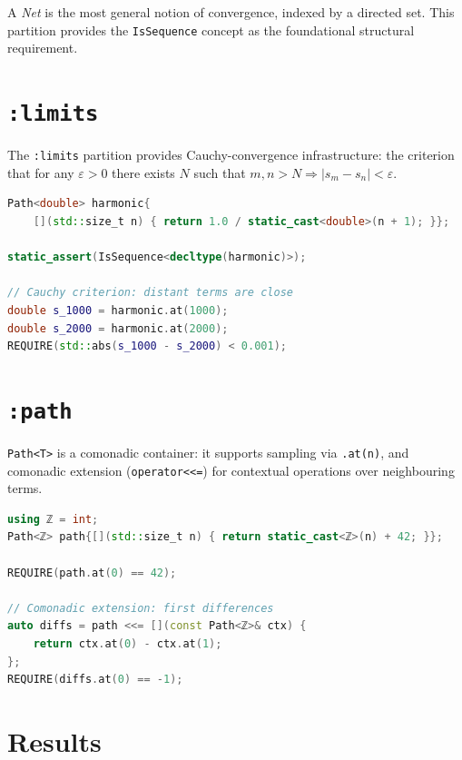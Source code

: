 \documentclass[11pt, a4paper]{report}
\begin{document}
A \emph{Net} is the most general notion of convergence, indexed by a directed set.
This partition provides the \texttt{IsSequence} concept as the foundational structural requirement.

\section{\texttt{:limits}}
\label{sec:sequences-limits}

The \texttt{:limits} partition provides Cauchy-convergence infrastructure: the criterion that for any $\varepsilon > 0$ there exists $N$ such that $m, n > N \Rightarrow |s_m - s_n| < \varepsilon$.

\begin{lstlisting}[language=C++, caption={Sequences: Cauchy convergence of the harmonic series (from \texttt{cauchy\_test.cpp}).}, label={lst:sequences-cauchy}]
Path<double> harmonic{
    [](std::size_t n) { return 1.0 / static_cast<double>(n + 1); }};

static_assert(IsSequence<decltype(harmonic)>);

// Cauchy criterion: distant terms are close
double s_1000 = harmonic.at(1000);
double s_2000 = harmonic.at(2000);
REQUIRE(std::abs(s_1000 - s_2000) < 0.001);
\end{lstlisting}

\section{\texttt{:path}}
\label{sec:sequences-path}

\texttt{Path<T>} is a comonadic container: it supports sampling via \texttt{.at(n)}, and comonadic extension (\texttt{operator<<=}) for contextual operations over neighbouring terms.

\begin{lstlisting}[language=C++, caption={Sequences: comonadic path extension (from \texttt{path\_test.cpp}).}, label={lst:sequences-path}]
using ℤ = int;
Path<ℤ> path{[](std::size_t n) { return static_cast<ℤ>(n) + 42; }};

REQUIRE(path.at(0) == 42);

// Comonadic extension: first differences
auto diffs = path <<= [](const Path<ℤ>& ctx) {
    return ctx.at(0) - ctx.at(1);
};
REQUIRE(diffs.at(0) == -1);
\end{lstlisting}

\section{Results}
\end{document}
